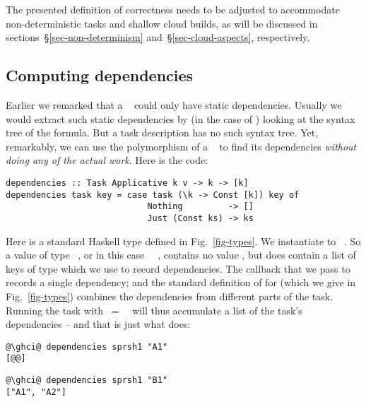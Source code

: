 The presented definition of correctness needs to be adjusted to accommodate
non-deterministic tasks and shallow cloud builds, as will be discussed
in sections~\S\ref{sec-non-determinism} and~\S\ref{sec-cloud-aspects},
respectively.

\subsection{Computing dependencies}\label{sec-deps}\label{secdeps}

Earlier we remarked that a ~ could only have static
dependencies. Usually we would extract such static dependencies by (in the case
of \Excel) looking at the syntax tree of the formula.  But a task description
has no such syntax tree. Yet, remarkably, we can use the polymorphism of a
~ to find its dependencies \emph{without doing any of
the actual work}. Here is the code:

\vspace{1mm}
\begin{verbatim}
dependencies :: Task Applicative k v -> k -> [k]
dependencies task key = case task (\k -> Const [k]) key of
                            Nothing         -> []
                            Just (Const ks) -> ks
\end{verbatim}
\vspace{1mm}

Here  is a standard Haskell type defined in Fig.~\ref{fig-types}. We
instantiate  to ~\hs{[@@k]}.  So a value of type ~,
or in this case ~\hs{[@@k]}~, contains no value , but does
contain a list of keys of type \hs{[@@k]} which we use to record dependencies.
The  callback that we pass to  records a single dependency;
and the standard definition of  for  (which we give
in Fig.~\ref{fig-types}) combines the dependencies from different parts of the
task. Running the task with ~=~~\hs{[@@k]} will thus
accumulate a list of the task's dependencies -- and that is just what
 does:
\vspace{1mm}
\begin{verbatim}
@\ghci@ dependencies sprsh1 "A1"
[@@]
\end{verbatim}
\begin{verbatim}
@\ghci@ dependencies sprsh1 "B1"
["A1", "A2"]
\end{verbatim}
\vspace{1mm}

